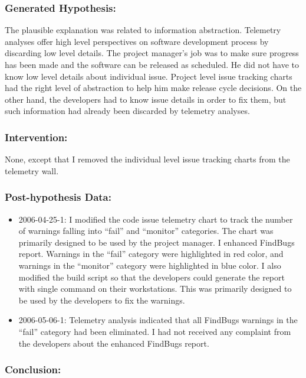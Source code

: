 \subsubsection{Generated Hypothesis:}

The plausible explanation was related to information abstraction. Telemetry analyses offer high level perspectives on software development process by discarding low level details. The project manager's job was to make sure progress has been made and the software can be released as scheduled. He did not have to know low level details about individual issue. Project level issue tracking charts had the right level of abstraction to help him make release cycle decisions. On the other hand, the developers had to know issue details in order to fix them, but such information had already been discarded by telemetry analyses. 

\subsubsection{Intervention:}

None, except that I removed the individual level issue tracking charts from the telemetry wall.

\subsubsection{Post-hypothesis Data:}
\begin{itemize}
  \setlength{\itemsep}{0pt}
  \setlength{\parskip}{0pt}
  \item 2006-04-25-1: I modified the code issue telemetry chart to track the number of warnings falling into ``fail'' and ``monitor'' categories. The chart was primarily designed to be used by the project manager. I enhanced FindBugs report. Warnings in the ``fail'' category were highlighted in red color, and warnings in the ``monitor'' category were highlighted in blue color. I also modified the build script so that the developers could generate the report with single command on their workstations. This was primarily designed to be used by the developers to fix the warnings.
  \item 2006-05-06-1: Telemetry analysis indicated that all FindBugs warnings in the ``fail'' category had been eliminated. I had not received any complaint from the developers about the enhanced FindBugs report.
\end{itemize}

\subsubsection{Conclusion:}

